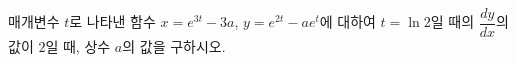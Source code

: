 매개변수 $t$로 나타낸 함수 $x=e^{3t}-3a$, $y=e^{2t}-ae^t$에 대하여 $t=\ln 2$일 때의 $\dfrac{dy}{dx}$의 값이 $2$일 때, 상수 $a$의 값을 구하시오.
